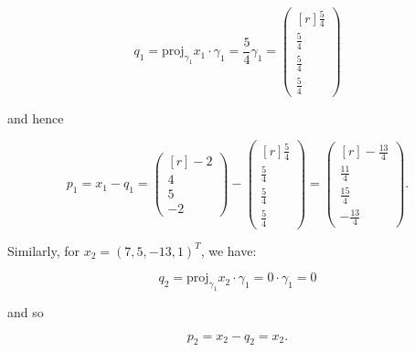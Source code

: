 \begin{solution}
  $$
  q_1 = \text{proj}_{\gamma_1} x_1 \cdot \gamma_1 = \frac{5}{4} \gamma_1 = \begin{pmatrix*}[r]
    \frac{5}{4} \\[6pt]
    \frac{5}{4} \\[6pt]
    \frac{5}{4} \\[6pt]
    \frac{5}{4}
  \end{pmatrix*}
  $$

  and hence

  $$
  p_1 = x_1 - q_1 
      = \begin{pmatrix*}[r]
       -2 \\[6pt]
        4 \\[6pt]
        5 \\[6pt]
       -2
      \end{pmatrix*}
      - \begin{pmatrix*}[r]
        \frac{5}{4} \\[6pt]
        \frac{5}{4} \\[6pt]
        \frac{5}{4} \\[6pt]
        \frac{5}{4}
      \end{pmatrix*}
      = \begin{pmatrix*}[r]
       -\frac{13}{4} \\[6pt]
        \frac{11}{4} \\[6pt]
        \frac{15}{4} \\[6pt]
       -\frac{13}{4}
      \end{pmatrix*}.
  $$

  Similarly, for $x_2 = (7, 5, -13, 1)^T$, we have:

  $$
  q_2 = \text{proj}_{\gamma_1} x_2 \cdot \gamma_1 = 0 \cdot \gamma_1 = 0
  $$

  and so

  $$
  p_2 = x_2 - q_2 = x_2.
  $$
  \ \\
\end{solution}